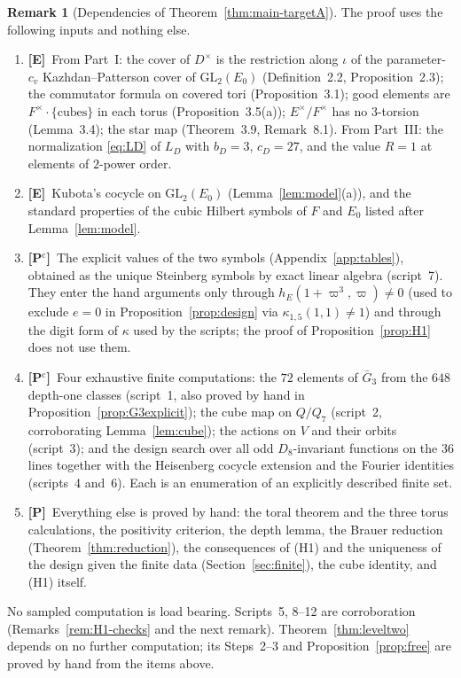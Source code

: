 \documentclass[11pt]{article}
\newcommand{\Ptag}{\textnormal{\textbf{[P]}}}
\newcommand{\Pctag}{\textnormal{\textbf{[P$^{\mathrm c}$]}}}
\newcommand{\Etag}{\textnormal{\textbf{[E]}}}
\theoremstyle{plain}
\theoremstyle{definition}
\newtheorem{remark}[theorem]{Remark}
\begin{document}
\begin{remark}[Dependencies of Theorem~\ref{thm:main-targetA}]\label{rem:dependencies}
The proof uses the following inputs and nothing else.
\begin{enumerate}[label=(D\arabic*),leftmargin=*]
\item \Etag\ From Part~I: the cover of $D^\times$ is the restriction
along $\iota$ of the parameter-$c_v$ Kazhdan--Patterson cover of
$\mathrm{GL}_2(E_0)$ (Definition~2.2, Proposition~2.3); the commutator
formula on covered tori (Proposition~3.1); good elements are
$F^\times\cdot\{\text{cubes}\}$ in each torus (Proposition~3.5(a));
$E^\times/F^\times$ has no $3$-torsion (Lemma~3.4); the star map
(Theorem~3.9, Remark~8.1).  From Part~III: the normalization
\eqref{eq:LD} of $L_D$ with $b_D=3$, $c_D=27$, and the value $R=1$ at
elements of $2$-power order.
\item \Etag\ Kubota's cocycle on $\mathrm{GL}_2(E_0)$
(Lemma~\ref{lem:model}(a)), and the standard properties of the cubic
Hilbert symbols of $F$ and $E_0$ listed after Lemma~\ref{lem:model}.
\item \Pctag\ The explicit values of the two symbols
(Appendix~\ref{app:tables}), obtained as the unique Steinberg symbols
by exact linear algebra (script~7).  They enter the hand arguments only
through $h_E(1+\varpi^3,\varpi)\ne0$ (used to exclude $e=0$ in
Proposition~\ref{prop:design} via $\kappa_{1,5}(1,1)\ne1$) and through
the digit form of $\kappa$ used by the scripts; the proof of
Proposition~\ref{prop:H1} does not use them.
\item \Pctag\ Four exhaustive finite computations: the $72$ elements of
$\bar G_3$ from the $648$ depth-one classes (script~1, also proved by
hand in Proposition~\ref{prop:G3explicit}); the cube map on $Q/Q_7$
(script~2, corroborating Lemma~\ref{lem:cube}); the actions on $V$ and
their orbits (script~3); and the design search over all odd
$D_8$-invariant functions on the $36$ lines together with the
Heisenberg cocycle extension and the Fourier identities (scripts~4
and~6).  Each is an enumeration of an explicitly described finite set.
\item \Ptag\ Everything else is proved by hand: the toral theorem and
the three torus calculations, the positivity criterion, the depth
lemma, the Brauer reduction (Theorem~\ref{thm:reduction}), the
consequences of (H1) and the uniqueness of the design given the finite
data (Section~\ref{sec:finite}), the cube identity, and (H1) itself.
\end{enumerate}
No sampled computation is load bearing.  Scripts~5, 8--12 are
corroboration (Remarks~\ref{rem:H1-checks} and the next remark).
Theorem~\ref{thm:leveltwo} depends on no further computation; its
Steps~2--3 and Proposition~\ref{prop:free} are proved by hand from the
items above.
\end{remark}
\end{document}
